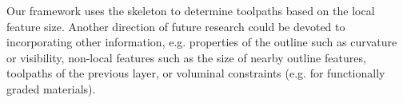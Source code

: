 Our framework uses the skeleton to determine toolpaths based on the local feature size.
Another direction of future research could be devoted to incorporating other information, e.g. properties of the outline such as curvature or visibility, non-local features such as the size of nearby outline features, toolpaths of the previous layer, or voluminal constraints (e.g. for functionally graded materials).

